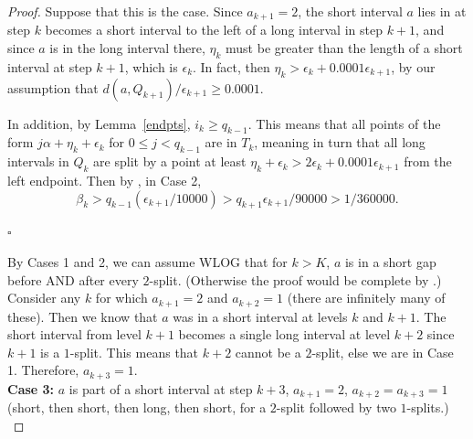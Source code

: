\documentclass[10pt,a4paper]{amsart}
\begin{document}
\begin{proof}
Suppose that this is the case. Since $a_{k+1} = 2$, the short interval $a$ lies in at step $k$ becomes a short interval to the left of a long interval in step $k+1$, and since $a$ is in the long interval there, $\eta_k$ must be greater than the length of a short interval at step $k+1$, which is $\epsilon_k$. In fact, then $\eta_k > \epsilon_k + 0.0001\epsilon_{k+1}$, by our assumption that $d(a, Q_{k+1})/\epsilon_{k+1} \geq 0.0001$. 

In addition, by Lemma~\ref{endpts}, $i_k \geq q_{k-1}$. This means that all points of the form $j\alpha + \eta_k + \epsilon_k$ for $0 \leq j < q_{k-1}$ are in $T_k$, meaning in turn that all long intervals in $Q_k$ are split by a point at least $\eta_k + \epsilon_k > 2\epsilon_k + 0.0001\epsilon_{k+1}$ from the left endpoint. Then by , in Case 2,
\[
\beta_k > q_{k-1}(\epsilon_{k+1}/10000) > q_{k+1} \epsilon_{k+1}/90000 > 1/360000.
\]
\begin{flushright}
    $\square$\\
\end{flushright}

By Cases 1 and 2, we can assume WLOG that for $k > K$, $a$ is in a short gap before AND after every $2$-split.
(Otherwise the proof would be complete by .)
Consider any $k$ for which $a_{k+1} = 2$ and $a_{k+2} = 1$ (there are infinitely many of these). Then we know that $a$ was in a short interval at levels $k$ and $k+1$. The short interval from level $k+1$ becomes a single long interval at level $k+2$ since $k+1$ is a $1$-split. This means that $k+2$ cannot be a $2$-split, else we are in Case 1. Therefore, 
$a_{k+3} = 1$. \\

\noindent
\textbf{Case 3:} $a$ is part of a short interval at step $k+3$, $a_{k+1} = 2$, $a_{k+2} = a_{k+3} = 1$ 
(short, then short, then long, then short, for a $2$-split followed by two $1$-splits.)\\


\end{proof}
\end{document}
